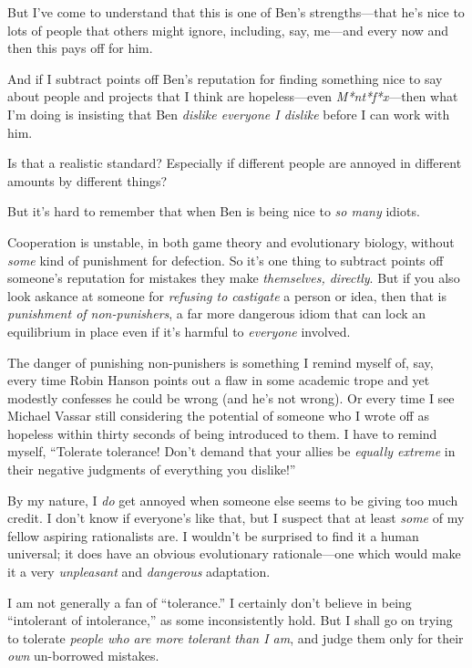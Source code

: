 {
 But I've come to understand that this is one of
Ben's strengths---that he's nice to
lots of people that others might ignore, including, say, me---and every
now and then this pays off for him.}

{
 And if I subtract points off Ben's reputation for
finding something nice to say about people and projects that I think
are hopeless---even \textit{M*nt*f*x}{}---then what I'm
doing is insisting that Ben \textit{dislike everyone I dislike} before
I can work with him.}

{
 Is that a realistic standard? Especially if different people are
annoyed in different amounts by different things?}

{
 But it's hard to remember that when Ben is being
nice to \textit{so many} idiots.}

{
 Cooperation is unstable, in both game theory and evolutionary
biology, without \textit{some} kind of punishment for defection. So
it's one thing to subtract points off
someone's reputation for mistakes they make
\textit{themselves, directly}. But if you also look askance at someone
for \textit{refusing to castigate} a person or idea, then that is
\textit{punishment of non-punishers}, a far more dangerous idiom that
can lock an equilibrium in place even if it's harmful
to \textit{everyone} involved.}

{
 The danger of punishing non-punishers is something I remind myself
of, say, every time Robin Hanson points out a flaw in some academic
trope and yet modestly confesses he could be wrong (and
he's not wrong). Or every time I see Michael Vassar
still considering the potential of someone who I wrote off as hopeless
within thirty seconds of being introduced to them. I have to remind
myself, ``Tolerate tolerance! Don't
demand that your allies be \textit{equally extreme} in their negative
judgments of everything you dislike!''}

{
 By my nature, I \textit{do} get annoyed when someone else seems to
be giving too much credit. I don't know if
everyone's like that, but I suspect that at least
\textit{some} of my fellow aspiring rationalists are. I
wouldn't be surprised to find it a human universal; it
does have an obvious evolutionary rationale---one which would make it a
very \textit{unpleasant} and \textit{dangerous} adaptation.}

{
 I am not generally a fan of
``tolerance.'' I certainly
don't believe in being ``intolerant of
intolerance,'' as some inconsistently hold. But I
shall go on trying to tolerate \textit{people who are more tolerant
than I am}, and judge them only for their \textit{own} un-borrowed
mistakes.}

